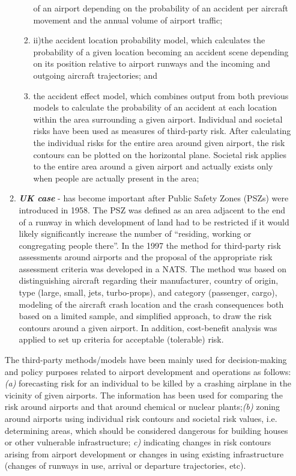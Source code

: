 \documentclass[a4paper, 10pt]{article}
\begin{document}
\begin{enumerate}
\begin{enumerate}
\begin{enumerate}
				of an airport depending on the probability of an accident per
				aircraft movement and the annual volume of airport traffic; 
						\item ii)the accident location probability model, which calculates the
				probability of a given location becoming an accident scene
				depending on its position relative to airport runways and the
				incoming and outgoing aircraft trajectories; and 
						\item the
				accident effect model, which combines output from both
				previous models to calculate the probability of an accident at
				each location within the area surrounding a given airport.
				Individual and societal risks have been used as measures of
				third-party risk. After calculating the individual risks for the
				entire area around given airport, the risk contours can be
				plotted on the horizontal plane. Societal risk applies to the
				entire area around a given airport and actually exists only when
				people are actually present in the area;
				\end{enumerate}
		\item \textit{\textbf{UK case}} - has become important after Public Safety
				Zones (PSZs) were introduced in 1958. The PSZ was defined
				as an area adjacent to the end of a runway in which
				development of land had to be restricted if it would likely
				significantly increase the number of “residing, working or
				congregating people there”. In the 1997 the method for
				third-party risk assessments around airports and the proposal of
				the appropriate risk assessment criteria was developed in a
				NATS. The method was based on distinguishing aircraft
				regarding their manufacturer, country of origin, type (large,
				small, jets, turbo-props), and category (passenger, cargo),
				modeling of the aircraft crash location and the crash
				consequences both based on a limited sample, and simplified
				approach, to draw the risk contours around a given airport. In
				addition, cost-benefit analysis was applied to set up criteria for
				acceptable (tolerable) risk.
\end{enumerate}\par
The third-party methods/models have been mainly used for
decision-making and policy purposes related to airport
development and operations as follows: \textit{(a)} forecasting risk for
an individual to be killed by a crashing airplane in the vicinity
of given airports. The information has been used for comparing
the risk around airports and that around chemical or nuclear
plants;\textit{(b)} zoning around airports using individual risk contours and societal risk values, i.e. determining areas, which should be
considered dangerous for building houses or other vulnerable
infrastructure; \textit{c)} indicating changes in risk contours arising
from airport development or changes in using existing
infrastructure (changes of runways in use, arrival or departure
trajectories, etc).\par


\end{enumerate}
\end{document}
